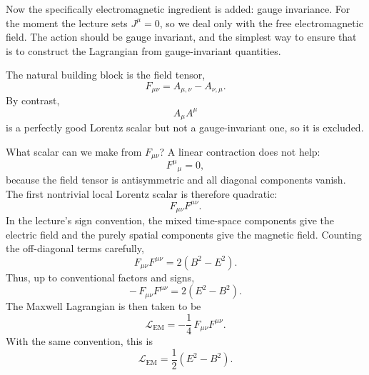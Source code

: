 Now the specifically electromagnetic ingredient is added: gauge invariance. For the moment the lecture sets \(J^\mu=0\), so we deal only with the free electromagnetic field. The action should be gauge invariant, and the simplest way to ensure that is to construct the Lagrangian from gauge-invariant quantities.

The natural building block is the field tensor,
\begin{equation}
F_{\mu\nu}=A_{\mu,\nu}-A_{\nu,\mu}.
\end{equation}
By contrast,
\begin{equation}
A_\mu A^\mu
\end{equation}
is a perfectly good Lorentz scalar but not a gauge-invariant one, so it is excluded.

What scalar can we make from \(F_{\mu\nu}\)? A linear contraction does not help:
\begin{equation}
F^\mu{}_\mu=0,
\end{equation}
because the field tensor is antisymmetric and all diagonal components vanish. The first nontrivial local Lorentz scalar is therefore quadratic:
\begin{equation}
F_{\mu\nu}F^{\mu\nu}.
\end{equation}
In the lecture's sign convention, the mixed time-space components give the electric field and the purely spatial components give the magnetic field. Counting the off-diagonal terms carefully,
\begin{equation}
F_{\mu\nu}F^{\mu\nu}=2(B^2-E^2).
\end{equation}
Thus, up to conventional factors and signs,
\begin{equation}
-\,F_{\mu\nu}F^{\mu\nu}=2(E^2-B^2).
\end{equation}
The Maxwell Lagrangian is then taken to be
\begin{equation}
\mathcal L_{\mathrm{EM}}
=
-\frac14\,F_{\mu\nu}F^{\mu\nu}.
\end{equation}
With the same convention, this is
\begin{equation}
\mathcal L_{\mathrm{EM}}
=
\frac12(E^2-B^2).
\end{equation}

